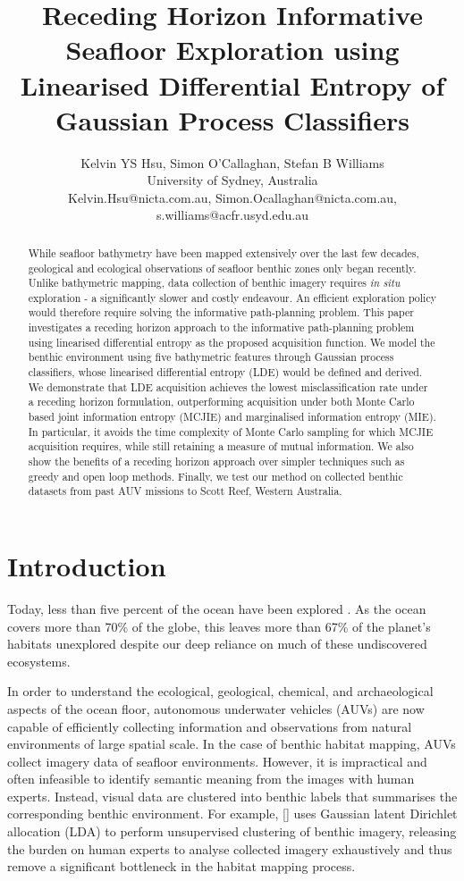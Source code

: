 \documentclass{article}
\title{Receding Horizon Informative Seafloor Exploration using Linearised Differential Entropy of Gaussian Process Classifiers}
\author{Kelvin YS Hsu, Simon O'Callaghan, Stefan B Williams \\ University of Sydney, Australia \\ 
Kelvin.Hsu@nicta.com.au, Simon.Ocallaghan@nicta.com.au, s.williams@acfr.usyd.edu.au}
\newcommand{\incite}[1]{\citeauthor{#1} [\citeyear{#1}]}
\begin{document}
\maketitle

\begin{abstract}
	While seafloor bathymetry have been mapped extensively over the last few decades, geological and ecological observations of seafloor benthic zones only began recently. Unlike bathymetric mapping, data collection of benthic imagery requires \textit{in situ} exploration - a significantly slower and costly endeavour. An efficient exploration policy would therefore require solving the informative path-planning problem. This paper investigates a receding horizon approach to the informative path-planning problem using linearised differential entropy as the proposed acquisition function. We model the benthic environment using five bathymetric features through Gaussian process classifiers, whose linearised differential entropy (LDE) would be defined and derived. We demonstrate that LDE acquisition achieves the lowest misclassification rate under a receding horizon formulation, outperforming acquisition under both Monte Carlo based joint information entropy (MCJIE) and marginalised information entropy (MIE). In particular, it avoids the time complexity of Monte Carlo sampling for which MCJIE acquisition requires, while still retaining a measure of mutual information. We also show the benefits of a receding horizon approach over simpler techniques such as greedy and open loop methods. Finally, we test our method on collected benthic datasets from past AUV missions to Scott Reef, Western Australia.
\end{abstract}

\section{Introduction}
\label{Section:Introduction}

	Today, less than five percent of the ocean have been explored \cite{NOAA}. As the ocean covers more than 70\% of the globe, this leaves more than 67\% of the planet's habitats unexplored despite our deep reliance on much of these undiscovered ecosystems.
	
	In order to understand the ecological, geological, chemical, and archaeological aspects of the ocean floor, autonomous underwater vehicles (AUVs) are now capable of efficiently collecting information and observations from natural environments of large spatial scale. In the case of benthic habitat mapping, AUVs collect imagery data of seafloor environments. However, it is impractical and often infeasible to identify semantic meaning from the images with human experts. Instead, visual data are clustered into benthic labels that summarises the corresponding benthic environment. For example, \incite{Steinberg2015128} uses Gaussian latent Dirichlet allocation (LDA) to perform unsupervised clustering of benthic imagery, releasing the burden on human experts to analyse collected imagery exhaustively and thus remove a significant bottleneck in the habitat mapping process.
\end{document}
